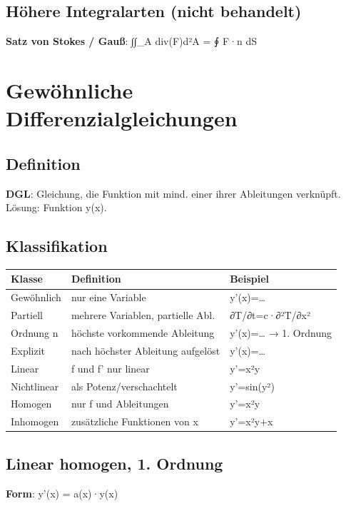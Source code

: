 \documentclass[11pt, a4paper]{article}
\begin{document}
\subsection{Höhere Integralarten (nicht behandelt)}
\textbf{Satz von Stokes / Gauß}: ∫∫\_A div(F)d²A = ∮ F·n dS



\section{Gewöhnliche Differenzialgleichungen}


\subsection{Definition}
\textbf{DGL}: Gleichung, die Funktion mit mind. einer ihrer Ableitungen verknüpft. Lösung: Funktion y(x).



\subsection{Klassifikation}

{\small
\begin{tabularx}{\linewidth}{XXX}
\hline
\rowcolor{tableheadbg}
{\color{white}\textbf{Klasse}} & {\color{white}\textbf{Definition}} & {\color{white}\textbf{Beispiel}} \\[2pt]
\hline
\endhead
\hline
\endfoot
Gewöhnlich & nur eine Variable & y'(x)=… \\
Partiell & mehrere Variablen, partielle Abl. & ∂T/∂t=c·∂²T/∂x² \\
Ordnung n & höchste vorkommende Ableitung & y'(x)=… → 1. Ordnung \\
Explizit & nach höchster Ableitung aufgelöst & y'(x)=… \\
Linear & f und f' nur linear & y'=x²y \\
Nichtlinear & als Potenz/verschachtelt & y'=sin(y²) \\
Homogen & nur f und Ableitungen & y'=x²y \\
Inhomogen & zusätzliche Funktionen von x & y'=x²y+x \\
\end{tabularx}
}



\subsection{Linear homogen, 1. Ordnung}
\textbf{Form}: y'(x) = a(x)·y(x)
\end{document}
